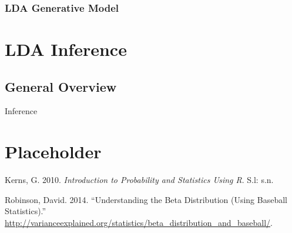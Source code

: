 \documentclass[]{book}
\theoremstyle{definition}
\theoremstyle{definition}
\theoremstyle{definition}
\theoremstyle{remark}
\begin{document}
\subsection{LDA Generative Model}\label{lda-generative-model}

\chapter{LDA Inference}\label{lda-inference}

\section{General Overview}\label{general-overview}

Inference

\chapter{Placeholder}\label{placeholder}

\hypertarget{refs}{}
\hypertarget{ref-kerns2010introduction}{}
Kerns, G. 2010. \emph{Introduction to Probability and Statistics Using
R}. S.l: s.n.

\hypertarget{ref-Robinson2014beta}{}
Robinson, David. 2014. ``Understanding the Beta Distribution (Using
Baseball Statistics).''
\url{http://varianceexplained.org/statistics/beta_distribution_and_baseball/}.
\end{document}
